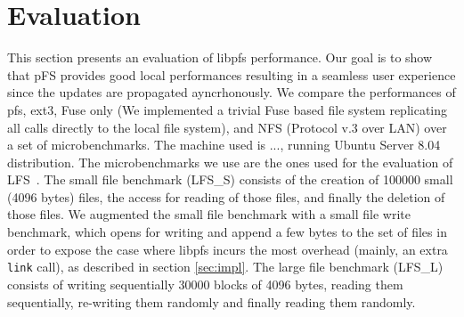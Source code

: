 
\section{Evaluation}
\label{sec:eval}

%

This section presents an evaluation of libpfs performance. Our goal is
to show that pFS provides good local performances resulting in a
seamless user experience since the updates are propagated
ayncrhonously. We compare the performances of pfs, ext3, Fuse only (We
implemented a trivial Fuse based file system replicating all calls
directly to the local file system), and NFS (Protocol v.3 over LAN)
over a set of microbenchmarks. The machine used is ..., running Ubuntu
Server 8.04 distribution.  The microbenchmarks we use are the ones used
for the evaluation of LFS~\cite{rosenblum:lfs}. The small file
benchmark (LFS\_S) consists of the creation of 100000 small (4096 bytes)
files, the access for reading of those files, and finally the deletion
of those files. We augmented the small file benchmark with a small file
write benchmark, which opens for writing and append a few bytes to the
set of files in order to expose the case where libpfs incurs the
most overhead (mainly, an extra {\tt link} call), as described in
section \ref{sec:impl}. The large file benchmark (LFS\_L) consists of
writing sequentially 30000 blocks of 4096 bytes, reading them
sequentially, re-writing them randomly and finally reading them
randomly.





\endinput

The actual implementation of pFS does not focus on performance. The
way pFS has been designed would be really adapted to a log-structured
file system. We believe that it is possible drastically improve the
performance by implementing pFS as a log-structured file-system.

